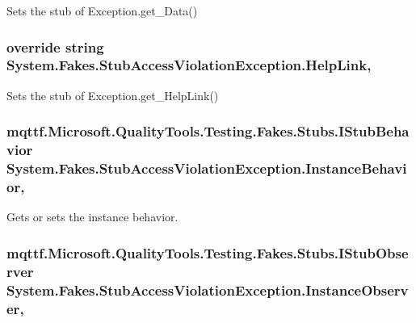 Sets the stub of Exception.\-get\-\_\-\-Data()

\hypertarget{class_system_1_1_fakes_1_1_stub_access_violation_exception_ade59a6c51875ab27b32efa95f8f9a1e9}{
\subsubsection[{Help\-Link}]{\setlength{\rightskip}{0pt plus 5cm}override string System.\-Fakes.\-Stub\-Access\-Violation\-Exception.\-Help\-Link\hspace{0.3cm}{\ttfamily [get]}, {\ttfamily [set]}}}\label{class_system_1_1_fakes_1_1_stub_access_violation_exception_ade59a6c51875ab27b32efa95f8f9a1e9}


Sets the stub of Exception.\-get\-\_\-\-Help\-Link()

\hypertarget{class_system_1_1_fakes_1_1_stub_access_violation_exception_a9090d5ade018ec384d0127dc50d812bf}{
\subsubsection[{Instance\-Behavior}]{\setlength{\rightskip}{0pt plus 5cm}mqttf.\-Microsoft.\-Quality\-Tools.\-Testing.\-Fakes.\-Stubs.\-I\-Stub\-Behavior System.\-Fakes.\-Stub\-Access\-Violation\-Exception.\-Instance\-Behavior\hspace{0.3cm}{\ttfamily [get]}, {\ttfamily [set]}}}\label{class_system_1_1_fakes_1_1_stub_access_violation_exception_a9090d5ade018ec384d0127dc50d812bf}


Gets or sets the instance behavior.

\hypertarget{class_system_1_1_fakes_1_1_stub_access_violation_exception_a298d0482adeaab845b3aad1a0a4fdf14}{
\subsubsection[{Instance\-Observer}]{\setlength{\rightskip}{0pt plus 5cm}mqttf.\-Microsoft.\-Quality\-Tools.\-Testing.\-Fakes.\-Stubs.\-I\-Stub\-Observer System.\-Fakes.\-Stub\-Access\-Violation\-Exception.\-Instance\-Observer\hspace{0.3cm}{\ttfamily [get]}, {\ttfamily [set]}}}\label{class_system_1_1_fakes_1_1_stub_access_violation_exception_a298d0482adeaab845b3aad1a0a4fdf14}


